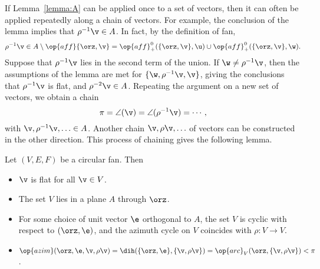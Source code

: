 If Lemma~\ref{lemma:A} can be applied once to a set of vectors, then
it can often be applied repeatedly along a chain of vectors.  For
example, the conclusion of the lemma implies that $\rho^{-1} \v \in
A$.  In fact, by the definition of fan,
\begin{displaymath}
  \rho^{-1}\v \in A \setminus \op{aff}\{\orz,\v\} 
= \op{aff}^0_+(\{\orz,\v\},\u) \cup \op{aff}^0_+(\{\orz,\v\},\w).
\end{displaymath}
Suppose that $\rho^{-1} \v$ lies in the second term of the union.  If
$\w\ne \rho^{-1}\v$, then the assumptions of the lemma are met for
$\{\w,\rho^{-1} \v,\v\}$, giving the conclusions that $\rho^{-1} \v$
is flat, and $\rho^{-2}\v\in A$.  Repeating the argument
on a new set of vectors, we obtain a chain
\begin{displaymath}
\pi=\angle(\v) = \angle(\rho^{-1} \v) = \cdots,
\end{displaymath}
with $\v,\rho^{-1}\v,\ldots\in A$.  Another chain $\v,\rho \v,\ldots$
of vectors can be constructed in the other direction.  This process of
chaining gives the following lemma.

\begin{lemma}
\label{lemma:circular}
Let $(V,E,F)$ be a circular fan. Then
\begin{itemize}
\item $\v$ is flat for all $\v\in V$.
\item The set $V$ lies in a plane $A$ through $\orz$.
\item For some choice of unit vector $\e$ orthogonal to $A$, the set
$V$ is cyclic with respect to $(\orz,\e)$, and the azimuth cycle on
$V$ coincides with $\rho:V\to V$.  
\item 
$
\op{azim}(\orz,\e,\v,\rho\v) = \dih(\{\orz,\e\},\{\v,\rho\v\})
=\op{arc}_V(\orz,\{\v,\rho \v\}) <\pi
$.
\end{itemize}
\end{lemma}

